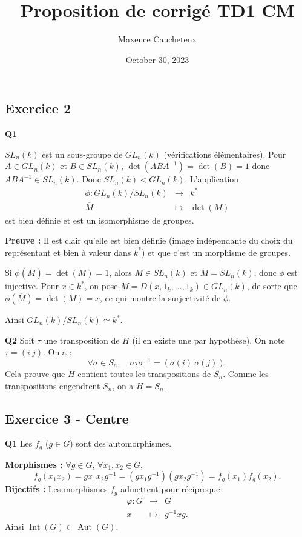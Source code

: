\documentclass[11pt,a4paper]{article}
\title{Proposition de corrigé TD1 CM}
\author{Maxence Caucheteux}
\date{October 30, 2023}
\newcommand{\normal}{\mathrel{\triangleleft}}
\begin{document}
\maketitle

\subsection*{Exercice 2}
\textbf{Q1}

$SL_n(k)$ est un sous-groupe de $GL_n(k)$ (vérifications élémentaires). Pour $A\in GL_n(k)$ et $B\in SL_n(k)$, $\det(ABA^{-1})=\det(B)=1$ donc $ABA^{-1}\in SL_n(k)$. Donc $SL_n(k)\normal GL_n(k)$. L'application
\[
\begin{array}{rcl}
\phi:GL_n(k)/SL_n(k)&\longrightarrow&k^*\\
\overline M&\longmapsto&\det(M)
\end{array}
\]
est bien définie et est un isomorphisme de groupes.

\textbf{Preuve :} Il est clair qu'elle est bien définie (image indépendante du choix du représentant et bien à valeur dans $k^*$) et que c'est un morphisme de groupes.

Si $\phi(\overline M)=\det(M)=1$, alors $M\in SL_n(k)$ et $\overline M=SL_n(k)$, donc $\phi$ est injective. Pour $x\in k^*$, on pose $M=D(x,1_k,\ldots,1_k)\in GL_n(k)$, de sorte que $\phi(\overline M)=\det(M)=x$, ce qui montre la surjectivité de $\phi$.

Ainsi $GL_n(k)/SL_n(k)\simeq k^*$.

\textbf{Q2} Soit $\tau$ une transposition de $H$ (il en existe une par hypothèse). On note $\tau=(i\ j)$. On a :
\[
  \forall\sigma\in S_n,\quad \sigma\tau\sigma^{-1}=(\sigma(i)\ \sigma(j)).
\]
Cela prouve que $H$ contient toutes les transpositions de $S_n$. Comme les transpositions engendrent $S_n$, on a $H=S_n$.

\subsection*{Exercice 3 - Centre}
\textbf{Q1} Les $f_g$ ($g\in G$) sont des automorphismes.

\textbf{Morphismes :} $\forall g\in G$, $\forall x_1,x_2\in G$,
\[
f_g(x_1x_2)=gx_1x_2g^{-1}=(gx_1g^{-1})(gx_2g^{-1})=f_g(x_1)f_g(x_2).
\]
\textbf{Bijectifs :} Les morphismes $f_g$ admettent pour réciproque
\[
\begin{array}{rcl}
\varphi:G&\longrightarrow&G\\
x&\longmapsto&g^{-1}xg.
\end{array}
\]
Ainsi $\operatorname{Int}(G)\subset\operatorname{Aut}(G)$.
\end{document}
